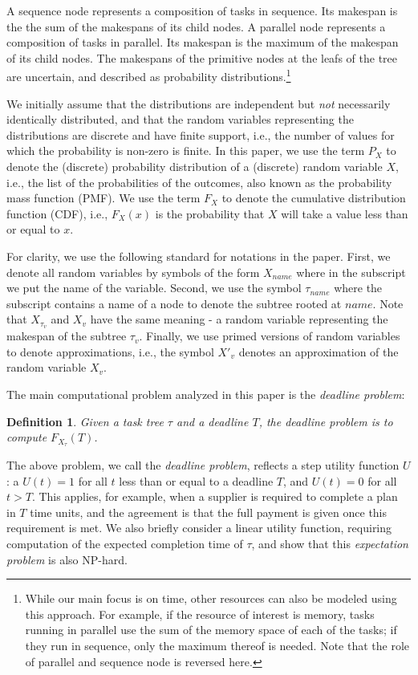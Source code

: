 \documentclass[review]{elsarticle}
\newtheorem{definition}{Definition}
\begin{document}
A sequence node represents a composition of tasks in sequence. Its makespan is the the sum of the makespans of its child nodes. A parallel node represents a composition of tasks in parallel. Its makespan is the maximum of the makespan of its child nodes. The makespans of the primitive nodes at the leafs of the tree are uncertain, and described as probability distributions.\footnote{While our main focus is on time, other resources can also be modeled using this approach. For example, if the resource of interest is memory, tasks running in parallel use the sum of the memory space of each of the tasks; if they run in sequence, only the maximum thereof is needed. Note that the role of parallel and sequence node is reversed here.}

We initially assume  that the distributions are  independent but {\em not} necessarily identically distributed, and that the random variables representing the distributions are discrete and have finite support, i.e., the number of values for which the probability is non-zero is finite.
In this paper, we use the term $P_X$ to denote the (discrete) probability distribution of a (discrete) random variable $X$, i.e., the list of the probabilities of the outcomes, also known as the probability mass function (PMF). We use the term $F_X$ to denote the cumulative distribution function (CDF), i.e., $F_X(x)$ is the probability that $X$ will take a value less than or equal to $x$. 

For clarity, we use the following standard for notations in the paper. First, we denote all random variables by symbols of the form $X_{name}$ where in the subscript we put the name of the variable. 
Second, we use the symbol $\tau_{name}$ where the subscript contains a name of a node to denote the subtree rooted  at $name$. Note that $X_{\tau_{v}}$ and $X_v$ have the same meaning - a random variable representing the makespan of the subtree $\tau_{v}$. Finally, we use primed versions of random variables to denote approximations, i.e., the symbol $X'_{v}$ denotes an approximation of the random variable $X_{v}$.


The main computational problem analyzed in this paper is the {\em deadline problem}: 
\begin{definition}\label{Def:Deadline}
	Given a task tree $\tau $ and a deadline $T$, the \emph{deadline problem} is to compute $F_{X_\tau}(T)$.
\end{definition}


The above problem, we call the {\em deadline problem}, reflects a step utility function $U$: a 
 $U(t)=1$ for all $t$ less than or equal to a deadline $T$, and $U(t)=0$ for all $t>T$. This 
 applies, for example, when a supplier is required to complete a plan in $T$ time units, and the agreement is that the full payment is given once this requirement is met.
 We also briefly consider a linear utility function, requiring computation of the expected completion time of $\tau$, and show that this {\em expectation problem}  
 is also NP-hard. 
 
\end{document}
